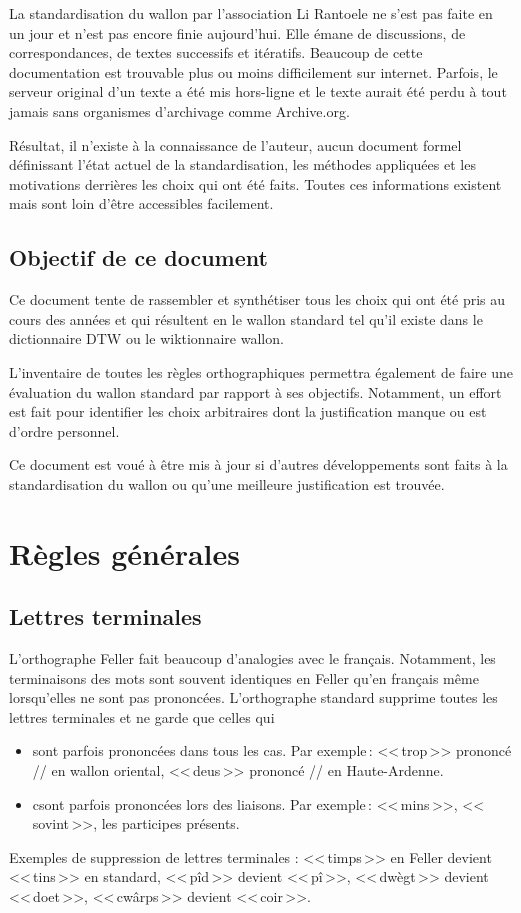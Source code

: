 \documentclass[french]{article}
\begin{document}
La standardisation du wallon par l'association Li Rantoele ne s'est pas faite en un jour et n'est pas encore finie aujourd'hui. Elle émane de discussions, de correspondances, de textes successifs et itératifs. Beaucoup de cette documentation est trouvable plus ou moins difficilement sur internet. Parfois, le serveur original d'un texte a été mis hors-ligne et le texte aurait été perdu à tout jamais sans organismes d'archivage comme Archive.org.

Résultat, il n'existe à la connaissance de l'auteur, aucun document formel définissant l'état actuel de la standardisation, les méthodes appliquées et les motivations derrières les choix qui ont été faits. Toutes ces informations existent mais sont loin d'être accessibles facilement.

\subsection{Objectif de ce document}

Ce document tente de rassembler et synthétiser tous les choix qui ont été pris au cours des années et qui résultent en le wallon standard tel qu'il existe dans le dictionnaire DTW ou le wiktionnaire wallon.

L'inventaire de toutes les règles orthographiques permettra également de faire une évaluation du wallon standard par rapport à ses objectifs. Notamment, un effort est fait pour identifier les choix arbitraires dont la justification manque ou est d'ordre personnel.

Ce document est voué à être mis à jour si d'autres développements sont faits à la standardisation du wallon ou qu'une meilleure justification est trouvée.

\section{Règles générales}

\subsection{Lettres terminales}

L'orthographe Feller fait beaucoup d'analogies avec le français. Notamment, les terminaisons des mots sont souvent identiques en Feller qu'en français même lorsqu'elles ne sont pas prononcées. L'orthographe standard supprime toutes les lettres terminales et ne garde que celles qui
\begin{itemize}
	\item sont parfois prononcées dans tous les cas. Par exemple\,: <<\,trop\,>> prononcé // en wallon oriental, <<\,deus\,>> prononcé // en Haute-Ardenne.
	\item csont parfois prononcées lors des liaisons. Par exemple\,: <<\,mins\,>>, <<\,sovint\,>>, les participes présents.
\end{itemize}
Exemples de suppression de lettres terminales : <<\,timps\,>> en Feller devient <<\,tins\,>> en standard, <<\,pîd\,>> devient <<\,pî\,>>, <<\,dwègt\,>> devient <<\,doet\,>>, <<\,cwârps\,>> devient <<\,coir\,>>.
\end{document}
